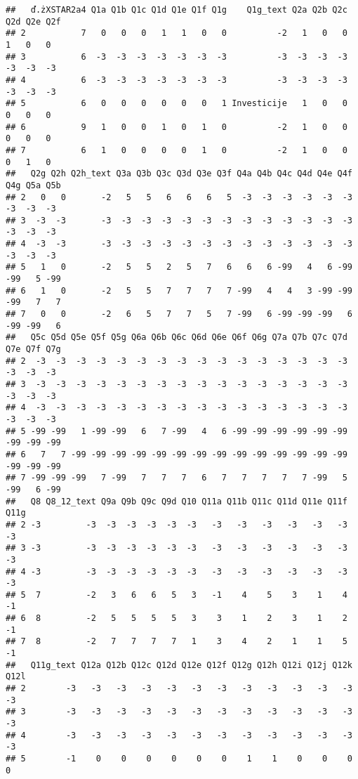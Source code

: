 \documentclass[
]{article}
\begin{document}
\begin{verbatim}
##   ď.żXSTAR2a4 Q1a Q1b Q1c Q1d Q1e Q1f Q1g    Q1g_text Q2a Q2b Q2c Q2d Q2e Q2f
## 2           7   0   0   0   1   1   0   0          -2   1   0   0   1   0   0
## 3           6  -3  -3  -3  -3  -3  -3  -3          -3  -3  -3  -3  -3  -3  -3
## 4           6  -3  -3  -3  -3  -3  -3  -3          -3  -3  -3  -3  -3  -3  -3
## 5           6   0   0   0   0   0   0   1 Investicije   1   0   0   0   0   0
## 6           9   1   0   0   1   0   1   0          -2   1   0   0   0   0   0
## 7           6   1   0   0   0   0   1   0          -2   1   0   0   0   1   0
##   Q2g Q2h Q2h_text Q3a Q3b Q3c Q3d Q3e Q3f Q4a Q4b Q4c Q4d Q4e Q4f Q4g Q5a Q5b
## 2   0   0       -2   5   5   6   6   6   5  -3  -3  -3  -3  -3  -3  -3  -3  -3
## 3  -3  -3       -3  -3  -3  -3  -3  -3  -3  -3  -3  -3  -3  -3  -3  -3  -3  -3
## 4  -3  -3       -3  -3  -3  -3  -3  -3  -3  -3  -3  -3  -3  -3  -3  -3  -3  -3
## 5   1   0       -2   5   5   2   5   7   6   6   6 -99   4   6 -99 -99   5 -99
## 6   1   0       -2   5   5   7   7   7   7 -99   4   4   3 -99 -99 -99   7   7
## 7   0   0       -2   6   5   7   7   5   7 -99   6 -99 -99 -99   6 -99 -99   6
##   Q5c Q5d Q5e Q5f Q5g Q6a Q6b Q6c Q6d Q6e Q6f Q6g Q7a Q7b Q7c Q7d Q7e Q7f Q7g
## 2  -3  -3  -3  -3  -3  -3  -3  -3  -3  -3  -3  -3  -3  -3  -3  -3  -3  -3  -3
## 3  -3  -3  -3  -3  -3  -3  -3  -3  -3  -3  -3  -3  -3  -3  -3  -3  -3  -3  -3
## 4  -3  -3  -3  -3  -3  -3  -3  -3  -3  -3  -3  -3  -3  -3  -3  -3  -3  -3  -3
## 5 -99 -99   1 -99 -99   6   7 -99   4   6 -99 -99 -99 -99 -99 -99 -99 -99 -99
## 6   7   7 -99 -99 -99 -99 -99 -99 -99 -99 -99 -99 -99 -99 -99 -99 -99 -99 -99
## 7 -99 -99 -99   7 -99   7   7   7   6   7   7   7   7   7 -99   5 -99   6 -99
##   Q8 Q8_12_text Q9a Q9b Q9c Q9d Q10 Q11a Q11b Q11c Q11d Q11e Q11f Q11g
## 2 -3         -3  -3  -3  -3  -3  -3   -3   -3   -3   -3   -3   -3   -3
## 3 -3         -3  -3  -3  -3  -3  -3   -3   -3   -3   -3   -3   -3   -3
## 4 -3         -3  -3  -3  -3  -3  -3   -3   -3   -3   -3   -3   -3   -3
## 5  7         -2   3   6   6   5   3   -1    4    5    3    1    4   -1
## 6  8         -2   5   5   5   5   3    3    1    2    3    1    2   -1
## 7  8         -2   7   7   7   7   1    3    4    2    1    1    5   -1
##   Q11g_text Q12a Q12b Q12c Q12d Q12e Q12f Q12g Q12h Q12i Q12j Q12k Q12l
## 2        -3   -3   -3   -3   -3   -3   -3   -3   -3   -3   -3   -3   -3
## 3        -3   -3   -3   -3   -3   -3   -3   -3   -3   -3   -3   -3   -3
## 4        -3   -3   -3   -3   -3   -3   -3   -3   -3   -3   -3   -3   -3
## 5        -1    0    0    0    0    0    0    1    1    0    0    0    0

\end{verbatim}
\end{document}
